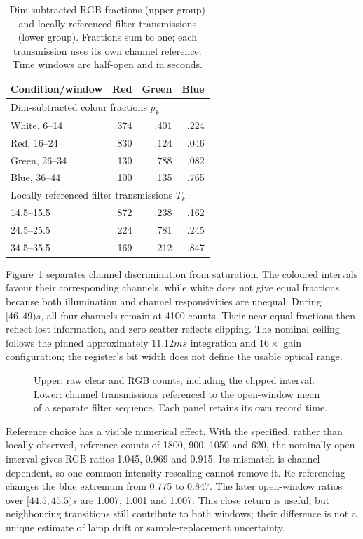 \begin{table}[!htbp]
\caption{Dim-subtracted RGB fractions (upper group) and locally referenced filter transmissions (lower group). Fractions sum to one; each transmission uses its own channel reference. Time windows are half-open and in seconds.}
\label{tab:light-rgb-spectral}
\centering\footnotesize
\begin{tabular}{@{}lrrr@{}}\toprule
Condition/window & Red & Green & Blue\\\midrule
\multicolumn{4}{l}{Dim-subtracted colour fractions $p_k$}\\
White, 6--14 & .374 & .401 & .224\\
Red, 16--24 & .830 & .124 & .046\\
Green, 26--34 & .130 & .788 & .082\\
Blue, 36--44 & .100 & .135 & .765\\\midrule
\multicolumn{4}{l}{Locally referenced filter transmissions $T_k$}\\
14.5--15.5 & .872 & .238 & .162\\
24.5--25.5 & .224 & .781 & .245\\
34.5--35.5 & .169 & .212 & .847\\\bottomrule
\end{tabular}
\end{table}

Figure~\ref{fig:light-rgb-spectral} separates channel discrimination from saturation. The coloured intervals favour their corresponding channels, while white does not give equal fractions because both illumination and channel responsivities are unequal. During $[46,49)\unit{s}$, all four channels remain at 4100 counts. Their near-equal fractions then reflect lost information, and zero scatter reflects clipping. The nominal ceiling follows the pinned approximately $11.12\unit{ms}$ integration and $16\times$ gain configuration\cite{arduinoapds,apds9960}; the register's bit width does not define the usable optical range.

\begin{figure}[!htbp]
\centering
\caption{Upper: raw clear and RGB counts, including the clipped interval. Lower: channel transmissions referenced to the open-window mean of a separate filter sequence. Each panel retains its own record time.}
\label{fig:light-rgb-spectral}
\end{figure}

Reference choice has a visible numerical effect. With the specified, rather than locally observed, reference counts of 1800, 900, 1050 and 620, the nominally open interval gives RGB ratios 1.045, 0.969 and 0.915. Its mismatch is channel dependent, so one common intensity rescaling cannot remove it. Re-referencing changes the blue extremum from 0.775 to 0.847. The later open-window ratios over $[44.5,45.5)\unit{s}$ are 1.007, 1.001 and 1.007. This close return is useful, but neighbouring transitions still contribute to both windows; their difference is not a unique estimate of lamp drift or sample-replacement uncertainty.

